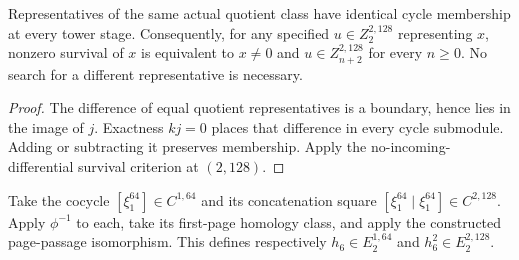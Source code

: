 \begin{proposition}
  \label{prop:h6-specified-representative-liftability}
  \leanok
  Representatives of the same actual quotient class have identical cycle
  membership at every tower stage. Consequently, for any specified
  $u\in Z_2^{2,128}$ representing $x$, nonzero survival of $x$ is equivalent
  to $x\ne0$ and $u\in Z_{n+2}^{2,128}$ for every $n\ge0$.
  No search for a different representative is necessary.
\end{proposition}
\begin{proof}
  The difference of equal quotient representatives is a boundary, hence
  lies in the image of $j$. Exactness $kj=0$ places that difference in
  every cycle submodule. Adding or subtracting it preserves membership.
  Apply the no-incoming-differential survival criterion at $(2,128)$.
  \leanok
\end{proof}

\begin{definition}
  \label{def:h6-constructed-square}
  \notready
  Take the cocycle $[\xi_1^{64}]\in C^{1,64}$ and its concatenation square
  $[\xi_1^{64}\mid\xi_1^{64}]\in C^{2,128}$.
  Apply $\phi^{-1}$ to each, take its first-page homology class, and apply
  the constructed page-passage isomorphism.  This defines respectively
  $h_6\in E_2^{1,64}$ and $h_6^2\in E_2^{2,128}$.
\end{definition}

